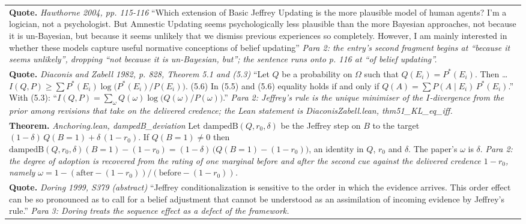 \documentclass[10pt]{article}
\theoremstyle{definition}
\newlength{\fullw}\setlength{\fullw}{25.9cm}
\begin{document}
{\begin{longtable}{|p{0.9cm}|p{12.2cm}|p{12.2cm}|}
\multicolumn{3}{|p{\fullw}|}{\textbf{Quote.} \textit{Hawthorne 2004, pp. 115-116} \newline ``Which extension of Basic Jeffrey Updating is the more plausible model of human agents? I'm a logician, not a psychologist. But Amnestic Updating seems psychologically less plausible than the more Bayesian approaches, not because it is un-Bayesian, but because it seems unlikely that we dismiss previous experiences so completely. However, I am mainly interested in whether these models capture useful normative conceptions of belief updating'' \newline \textit{Para 2: the entry's second fragment begins at ``because it seems unlikely'', dropping ``not because it is un-Bayesian, but''; the sentence runs onto p. 116 at ``of belief updating''.}} \\
\multicolumn{3}{|p{\fullw}|}{\textbf{Quote.} \textit{Diaconis and Zabell 1982, p. 828, Theorem 5.1 and (5.3)} \newline ``Let $Q$ be a probability on $\Omega$ such that $Q(E_i) = P^*(E_i)$. Then \ldots $I(Q,P) \geq \sum P^*(E_i)\log\big(P^*(E_i)/P(E_i)\big)$. (5.6) In (5.5) and (5.6) equality holds if and only if $Q(A) = \sum P(A \mid E_i)\,P^*(E_i)$.'' With (5.3): ``$I(Q,P) = \sum_\omega Q(\omega)\log\big(Q(\omega)/P(\omega)\big)$.'' \newline \textit{Para 2: Jeffrey's rule is the unique minimiser of the $I$-divergence from the prior among revisions that take on the delivered credence; the Lean statement is DiaconisZabell.lean, thm51\_KL\_eq\_iff.}} \\
\multicolumn{3}{|p{\fullw}|}{\textbf{Theorem.} \textit{Anchoring.lean, dampedB\_deviation} \newline Let $\mathrm{dampedB}(Q,r_0,\delta)$ be the Jeffrey step on $B$ to the target $(1-\delta)\,Q(B{=}1) + \delta\,(1-r_0)$. If $Q(B{=}1) \neq 0$ then $\mathrm{dampedB}(Q,r_0,\delta)(B{=}1) - (1-r_0) = (1-\delta)\,\big(Q(B{=}1) - (1-r_0)\big)$, an identity in $Q$, $r_0$ and $\delta$. The paper's $\omega$ is $\delta$. \newline \textit{Para 2: the degree of adoption is recovered from the rating of one marginal before and after the second cue against the delivered credence $1-r_0$, namely $\omega = 1 - (\text{after} - (1-r_0))/(\text{before} - (1-r_0))$.}} \\
\multicolumn{3}{|p{\fullw}|}{\textbf{Quote.} \textit{Doring 1999, S379 (abstract)} \newline ``Jeffrey conditionalization is sensitive to the order in which the evidence arrives. This order effect can be so pronounced as to call for a belief adjustment that cannot be understood as an assimilation of incoming evidence by Jeffrey's rule.'' \newline \textit{Para 3: Doring treats the sequence effect as a defect of the framework.}} \\

\end{longtable}}
\end{document}
